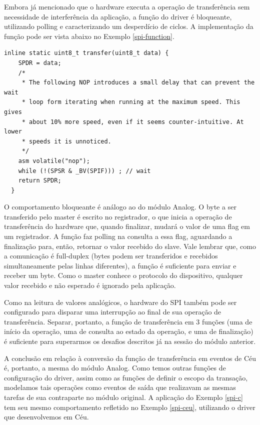 \documentclass[11pt]{article}
\begin{document}
\par Embora já mencionado que o hardware executa a operação de transferência sem necessidade de interferência da aplicação, a função do driver é bloqueante, utilizando polling e caracterizando um desperdício de ciclos. A implementação da função pode ser vista abaixo no Exemplo \ref{spi-function}. 
\begin{lstlisting}[style=CStyle,label=spi-function,caption=Implementação bloqueante da função de transferência SPI]
  inline static uint8_t transfer(uint8_t data) {
    SPDR = data;
    /*
     * The following NOP introduces a small delay that can prevent the wait
     * loop form iterating when running at the maximum speed. This gives
     * about 10% more speed, even if it seems counter-intuitive. At lower
     * speeds it is unnoticed.
     */
    asm volatile("nop");
    while (!(SPSR & _BV(SPIF))) ; // wait
    return SPDR;
  }
\end{lstlisting}
\par O comportamento bloqueante é análogo ao do módulo Analog. O byte a ser transferido pelo master é escrito no registrador, o que inicia a operação de transferência do hardware que, quando finalizar, mudará o valor de uma flag em um registrador. A função faz polling na consulta a essa flag, aguardando a finalização para, então, retornar o valor recebido do slave. Vale lembrar que, como a comunicação é full-duplex (bytes podem ser transferidos e recebidos simultaneamente pelas linhas diferentes), a função é suficiente para enviar e receber um byte. Como o master conhece o protocolo do dispositivo, qualquer valor recebido e não esperado é ignorado pela aplicação.
\par Como na leitura de valores analógicos, o hardware do SPI também pode ser configurado para disparar uma interrupção ao final de sua operação de transferência. Separar, portanto, a função de transferência em 3 funções (uma de início da operação, uma de consulta ao estado da operação, e uma de finalização) é suficiente para superarmos os desafios descritos já na sessão do módulo anterior. 
\par A conclusão em relação à conversão da função de transferência em eventos de Céu é, portanto, a mesma do módulo Analog. Como temos outras funções de configuração do driver, assim como as funções de definir o escopo da transação, modelamos tais operações como eventos de saída que realizavam as mesmas tarefas de sua contraparte no módulo original. A aplicação do Exemplo \ref{spi-c} tem seu mesmo comportamento refletido no Exemplo \ref{spi-ceu}, utilizando o driver que desenvolvemos em Céu.
\end{document}
